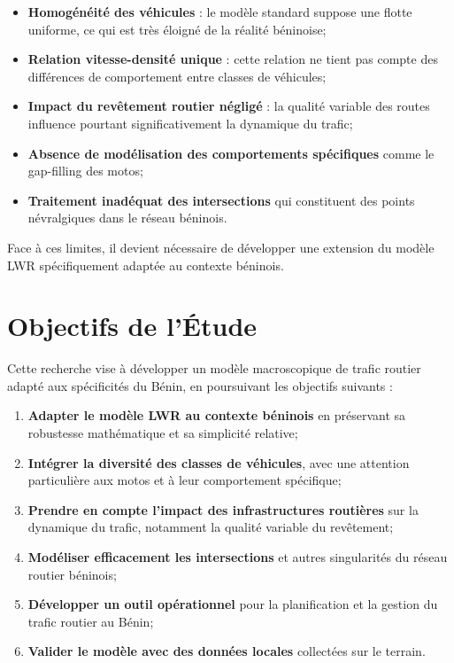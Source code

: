 \begin{itemize}
\item \textbf{Homogénéité des véhicules} : le modèle standard suppose une flotte uniforme, ce qui est très éloigné de la réalité béninoise;
\item \textbf{Relation vitesse-densité unique} : cette relation ne tient pas compte des différences de comportement entre classes de véhicules;
\item \textbf{Impact du revêtement routier négligé} : la qualité variable des routes influence pourtant significativement la dynamique du trafic;
\item \textbf{Absence de modélisation des comportements spécifiques} comme le gap-filling des motos;
\item \textbf{Traitement inadéquat des intersections} qui constituent des points névralgiques dans le réseau béninois.
\end{itemize}

Face à ces limites, il devient nécessaire de développer une extension du modèle LWR spécifiquement adaptée au contexte béninois.

\section{Objectifs de l'Étude}
\label{sec:objectifs}

Cette recherche vise à développer un modèle macroscopique de trafic routier adapté aux spécificités du Bénin, en poursuivant les objectifs suivants :

\begin{enumerate}
\item \textbf{Adapter le modèle LWR au contexte béninois} en préservant sa robustesse mathématique et sa simplicité relative;
\item \textbf{Intégrer la diversité des classes de véhicules}, avec une attention particulière aux motos et à leur comportement spécifique;
\item \textbf{Prendre en compte l'impact des infrastructures routières} sur la dynamique du trafic, notamment la qualité variable du revêtement;
\item \textbf{Modéliser efficacement les intersections} et autres singularités du réseau routier béninois;
\item \textbf{Développer un outil opérationnel} pour la planification et la gestion du trafic routier au Bénin;
\item \textbf{Valider le modèle avec des données locales} collectées sur le terrain.
\end{enumerate}

